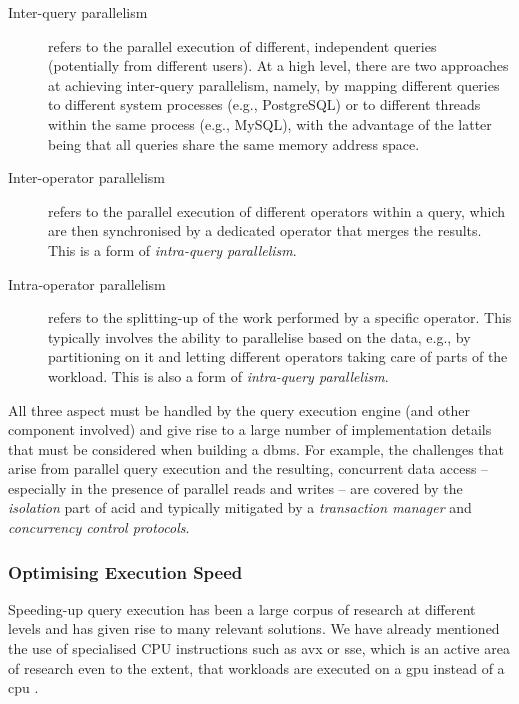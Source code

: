 \begin{description}
    \item[Inter-query parallelism] refers to the parallel execution of different, independent queries (potentially from different users). At a high level, there are two approaches at achieving inter-query parallelism, namely, by mapping different queries to different system processes (e.g., PostgreSQL) or to different threads within the same process (e.g., MySQL), with the advantage of the latter being that all queries share the same memory address space.
    \item[Inter-operator parallelism] refers to the parallel execution of different operators within a query, which are then synchronised by a dedicated operator that merges the results. This is a form of \emph{intra-query parallelism}.
    \item[Intra-operator parallelism] refers to the splitting-up of the work performed by a specific operator. This typically involves the ability to parallelise based on the data, e.g., by partitioning on it and letting different operators taking care of parts of the workload.  This is also a form of \emph{intra-query parallelism}.
\end{description}

All three aspect must be handled by the query execution engine (and other component involved) and give rise to a large number of implementation details that must be considered when building a \acrshort{dbms}. For example, the challenges that arise from parallel query execution and the resulting, concurrent data access -- especially in the presence of parallel reads and writes -- are covered by the \emph{isolation} part of \acrshort{acid} and typically mitigated by a \emph{transaction manager} and \emph{concurrency control protocols}.

\subsubsection{Optimising Execution Speed}
Speeding-up query execution has been a large corpus of research at different levels and has given rise to many relevant solutions. We have already mentioned the use of specialised CPU instructions such as \acrshort{avx} or \acrshort{sse}, which is an active area of research \cite{Idreos:2012MonetDB,Polychroniou:2020VIP,Polychroniou:2019Towards,Shen:2021Using} even to the extent, that workloads are executed on a \acrshort{gpu} instead of a \acrshort{cpu} \cite{Paul:2021Database}.

